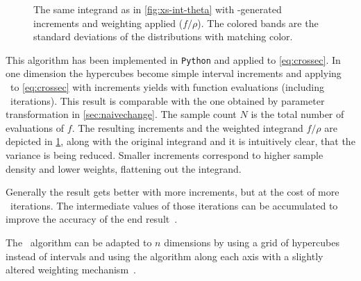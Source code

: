 \begin{figure}[ht]
  \centering {}
  \caption[\(2\pi\dv{\sigma}{\theta}\) scaled to increments found by
  \vegas\ ]{\label{fig:xs-int-vegas} The same integrand as in
    \cref{fig:xs-int-theta} with \vegas-generated increments and
    weighting applied (\(f/\rho\)). The colored bands are the standard
    deviations of the distributions with matching color.}
\end{figure}
%
This algorithm has been implemented in \texttt{Python} and applied to
\cref{eq:crossec}.  In one dimension the hypercubes become simple
interval increments and applying \vegas\ to \cref{eq:crossec} with
 increments yields
 with
 function evaluations (including
\vegas\ iterations). This result is comparable with the one obtained
by parameter transformation in \cref{sec:naivechange}.  The sample
count \(N\) is the total number of evaluations of \(f\). The resulting
increments and the weighted integrand \(f/\rho\) are depicted in
\cref{fig:xs-int-vegas}, along with the original integrand and it is
intuitively clear, that the variance is being reduced. Smaller
increments correspond to higher sample density and lower weights,
flattening out the integrand.

Generally the result gets better with more increments, but at the cost
of more \vegas\ iterations. The intermediate values of those
iterations can be accumulated to improve the accuracy of the end
result~\cite[197]{Lepage:19781an}.

The \vegas\ algorithm can be adapted to \(n\) dimensions by using a
grid of hypercubes instead of intervals and using the algorithm along
each axis with a slightly altered weighting
mechanism~\cite[197]{Lepage:19781an}.

